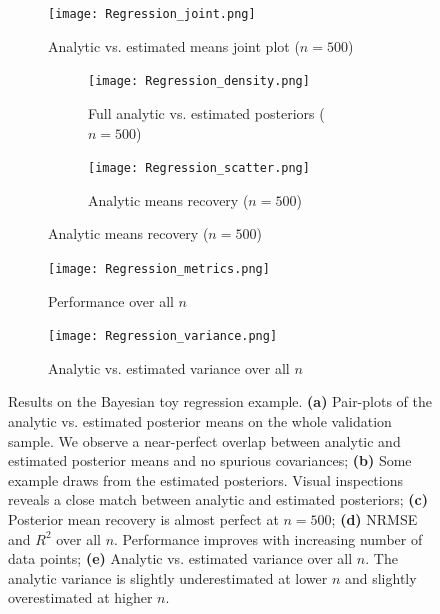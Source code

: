 \documentclass[9pt,twoside,lineno]{pnas-new}
\begin{document}
\begin{figure}[H]
\centering
\begin{subfigure}{.49\textwidth}
    \texttt{[image: Regression\_joint.png]}
    \caption{Analytic vs. estimated means joint plot ($n=500$)}
    \label{fig:Fig.3a}
\end{subfigure}
\begin{subfigure}{.49\textwidth}
	\begin{subfigure}{.95\textwidth}
 		\texttt{[image: Regression\_density.png]}
    	\caption{Full analytic vs. estimated posteriors ($n=500$)}
    \label{fig:Fig.3b}
	\end{subfigure}
	\begin{subfigure}{.95\textwidth}
 		\texttt{[image: Regression\_scatter.png]}
    	\caption{Analytic means recovery ($n=500$)}
    \label{fig:Fig.3c}
	\end{subfigure}
\end{subfigure}
\begin{subfigure}{.47\textwidth}
 		\texttt{[image: Regression\_metrics.png]}
    	\caption{Performance over all $n$}
    \label{fig:Fig.3d}
\end{subfigure}
\begin{subfigure}{.52\textwidth}
 		\texttt{[image: Regression\_variance.png]}
    	\caption{Analytic vs. estimated variance over all $n$}
    \label{fig:Fig.3e}
\end{subfigure}
\caption[short]{Results on the Bayesian toy regression example. \textbf{(a)} Pair-plots of the analytic vs. estimated posterior means on the whole validation sample. We observe a near-perfect overlap between analytic and estimated posterior means and no spurious covariances; \textbf{(b)} Some example draws from the estimated posteriors. Visual inspections reveals a close match between analytic and estimated posteriors; \textbf{(c)} Posterior mean recovery is almost perfect at $n=500$; \textbf{(d)} NRMSE and $R^{2}$ over all $n$. Performance improves with increasing number of data points; \textbf{(e)} Analytic vs. estimated variance over all $n$. The analytic variance is slightly underestimated at lower $n$ and slightly overestimated at higher $n$.} \label{fig:Fig.3}
\end{figure}
\end{document}
